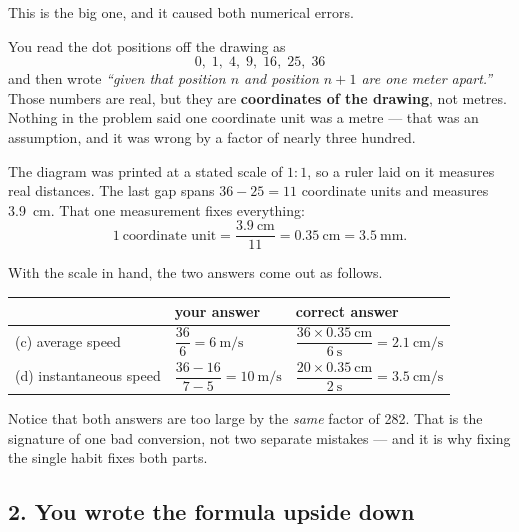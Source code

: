 \documentclass[11pt]{article}
\begin{document}
This is the big one, and it caused both numerical errors.

You read the dot positions off the drawing as
\[
0,\; 1,\; 4,\; 9,\; 16,\; 25,\; 36
\]
and then wrote \emph{``given that position $n$ and position $n+1$ are one meter apart.''}
Those numbers are real, but they are \textbf{coordinates of the drawing}, not metres.
Nothing in the problem said one coordinate unit was a metre --- that was an assumption,
and it was wrong by a factor of nearly three hundred.

\begin{whatwrong}
The diagram was printed at a stated scale of $1:1$, so a ruler laid on it measures real
distances. The last gap spans $36 - 25 = 11$ coordinate units and measures
\SI{3.9}{\centi\metre}. That one measurement fixes everything:
\[
1\ \text{coordinate unit} = \frac{\SI{3.9}{\centi\metre}}{11} = \SI{0.35}{\centi\metre}
= \SI{3.5}{\milli\metre}.
\]
\end{whatwrong}

With the scale in hand, the two answers come out as follows.

\begin{center}
\renewcommand{\arraystretch}{1.3}
\setlength{\tabcolsep}{5pt}
\begin{tabular}{@{}lll@{}}
\toprule
 & \textbf{your answer} & \textbf{correct answer} \\
\midrule
(c) average speed
  & $\dfrac{36}{6} = \SI{6}{\metre\per\second}$
  & $\dfrac{36 \times \SI{0.35}{\centi\metre}}{\SI{6}{\second}}
     = \SI{2.1}{\centi\metre\per\second}$ \\[10pt]
(d) instantaneous speed
  & $\dfrac{36-16}{7-5} = \SI{10}{\metre\per\second}$
  & $\dfrac{20 \times \SI{0.35}{\centi\metre}}{\SI{2}{\second}}
     = \SI{3.5}{\centi\metre\per\second}$ \\[6pt]
\bottomrule
\end{tabular}
\end{center}

\medskip
Notice that both answers are too large by the \emph{same} factor of \num{282}. That is
the signature of one bad conversion, not two separate mistakes --- and it is why fixing
the single habit fixes both parts.

\subsection*{2. You wrote the formula upside down}
\end{document}
